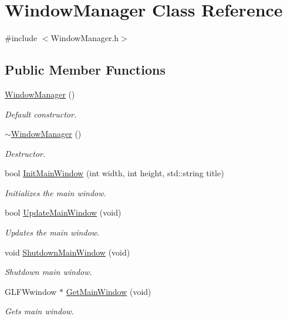 \hypertarget{class_window_manager}{}\section{Window\+Manager Class Reference}
\label{class_window_manager}




  




{\ttfamily \#include $<$Window\+Manager.\+h$>$}

\subsection*{Public Member Functions}
\begin{DoxyCompactItemize}
\item 
\mbox{\hyperlink{class_window_manager_a3a283b34c19aaa20296befaabad4d29b}{Window\+Manager}} ()
\begin{DoxyCompactList}\small\item\em Default constructor. \end{DoxyCompactList}\item 
\mbox{\hyperlink{class_window_manager_a19fd6e41c42760af82460d9851780d82}{$\sim$\+Window\+Manager}} ()
\begin{DoxyCompactList}\small\item\em Destructor. \end{DoxyCompactList}\item 
bool \mbox{\hyperlink{class_window_manager_acc25a22a88b12463ca20722faa0ad700}{Init\+Main\+Window}} (int width, int height, std\+::string title)
\begin{DoxyCompactList}\small\item\em Initializes the main window. \end{DoxyCompactList}\item 
bool \mbox{\hyperlink{class_window_manager_abb5368b5020234593cce7c2fe665b0f7}{Update\+Main\+Window}} (void)
\begin{DoxyCompactList}\small\item\em Updates the main window. \end{DoxyCompactList}\item 
void \mbox{\hyperlink{class_window_manager_a565fbbf0fdd0683ba35467e3d4e5965f}{Shutdown\+Main\+Window}} (void)
\begin{DoxyCompactList}\small\item\em Shutdown main window. \end{DoxyCompactList}\item 
G\+L\+F\+Wwindow $\ast$ \mbox{\hyperlink{class_window_manager_a89a767f4c3a1fd248cad0a2b560420b7}{Get\+Main\+Window}} (void)
\begin{DoxyCompactList}\small\item\em Gets main window. \end{DoxyCompactList}\end{DoxyCompactItemize}


